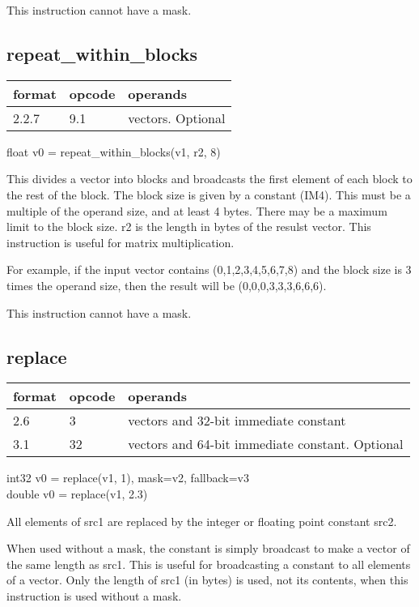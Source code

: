 \documentclass[forwardcom.tex]{subfiles}
\begin{document}
This instruction cannot have a mask.
\vv

\subsection{repeat\_within\_blocks}
\label{table:repeatWithinBlockInstruction}
\begin{tabular}{|p{12mm}|p{15mm}|p{100mm}|}
\hline
\bfseries format & \bfseries opcode & \bfseries operands \\ \hline
2.2.7 & 9.1 & vectors. Optional \\ \hline
\end{tabular}
\vv

float v0 = repeat\_within\_blocks(v1, r2, 8) 
\vv

This divides a vector into blocks and broadcasts the first element of each block to the rest of the block. The block size is given by a constant (IM4). This must be a multiple of the operand size, and at least 4 bytes. There may be a maximum limit to the block size. r2 is the length in bytes of the resulst vector. This instruction is useful for matrix multiplication.
\vv

For example, if the input vector contains (0,1,2,3,4,5,6,7,8) and the block size is 3 times the operand size, then the result will be (0,0,0,3,3,3,6,6,6).
\vv

This instruction cannot have a mask.
\vv

\subsection{replace}
\label{table:replaceInstruction}
\begin{tabular}{|p{12mm}|p{15mm}|p{100mm}|}
\hline
\bfseries format & \bfseries opcode & \bfseries operands \\ \hline
2.6 & 3 & vectors and 32-bit immediate constant \\ \hline
3.1 & 32 & vectors and 64-bit immediate constant. Optional \\ \hline
\end{tabular}
\vv

int32 v0 = replace(v1, 1), mask=v2, fallback=v3\\
double v0 = replace(v1, 2.3)
\vv

All elements of src1 are replaced by the integer or floating point constant src2.
\vv

When used without a mask, the constant is simply broadcast to make a vector of the same length as src1. This is useful for broadcasting a constant to all elements of a vector. Only the length of src1 (in bytes) is used, not its contents, when this instruction is used without a mask.
\vv
\end{document}
